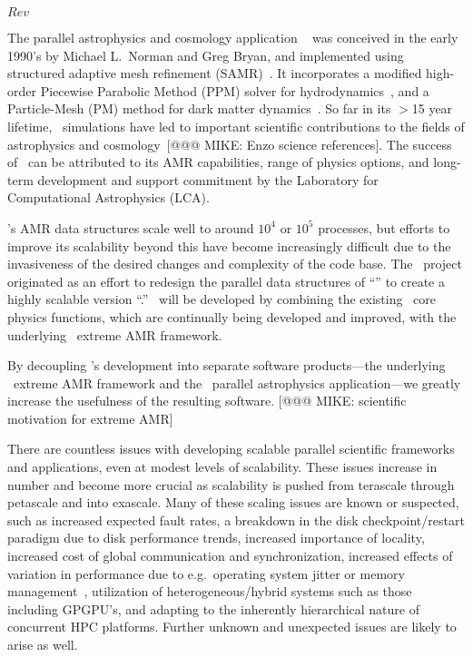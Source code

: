 \documentclass[11pt,letterpaper]{article}
\begin{document}

$Rev$


 The parallel astrophysics and
cosmology application \enzo~\cite{OsBr04} was conceived in the early
1990's by Michael L.~Norman and Greg Bryan, and implemented using
structured adaptive mesh refinement (SAMR)~\cite{BeCo89}.  It
incorporates a modified high-order Piecewise Parabolic Method (PPM)
solver for hydrodynamics~\cite{WoCo84b}, and a Particle-Mesh (PM)
method for dark matter dynamics~\cite{HoEa88}.  So far in its $>$15
year lifetime, \enzo\ simulations have led to important scientific
contributions to the fields of astrophysics and cosmology~[@@@ MIKE:
Enzo science references].  The success of \enzo\ can be attributed to
its AMR capabilities, range of physics options, and long-term
development and support commitment by the Laboratory for Computational
Astrophysics (LCA).

\enzo's AMR data structures scale well to around $10^4$ or $10^5$
processes, but efforts to improve its scalability beyond this have
become increasingly difficult due to the invasiveness of the desired
changes and complexity of the code base.  The \cello\ project
originated as an effort to redesign the parallel data structures of
``\enzo'' to create a highly scalable version ``\enzoii.''  \enzoii\
will be developed by combining the existing \enzo\ core physics
functions, which are continually being developed and improved, with
the underlying \cello\ extreme AMR framework.

By decoupling \enzoii's development into separate software
products---the underlying \cello\ extreme AMR framework and the
\enzoii\ parallel astrophysics application---we greatly increase the
usefulness of the resulting software.  [@@@ MIKE: scientific
motivation for extreme AMR]

 There are countless issues
with developing scalable parallel scientific frameworks and
applications, even at modest levels of scalability.  These issues
increase in number and become more crucial as scalability is pushed
from terascale through petascale and into exascale.  Many of these
scaling issues are known or suspected, such as
%
increased expected fault rates,
%
a breakdown in the disk checkpoint/restart paradigm due to disk
performance trends,
%
%
increased importance of locality,
%
increased cost of global communication and synchronization,
%
%
increased effects of variation in performance due to e.g.~operating
system jitter or memory management~\cite{StSh09},
%
utilization of heterogeneous/hybrid systems such as those including
GPGPU's,
%
and adapting to the inherently hierarchical nature of concurrent HPC
platforms.  Further unknown and unexpected issues are likely to arise
as well.
\end{document}
